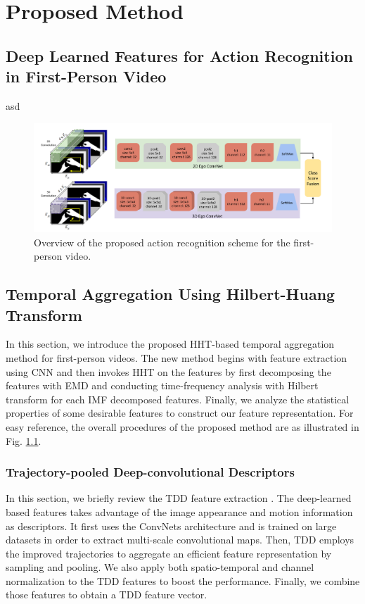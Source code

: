 \newpage
\chapter{Proposed Method}
\section{Deep Learned Features for Action Recognition in First-Person Video}

asd 
\begin{figure}[htttp]
\centering
\includegraphics[width=1\textwidth]{figures/framework2}
\caption{Overview of the proposed action recognition scheme for the first-person video.
} 
\label{fig:framework}
\end{figure}

\section{Temporal Aggregation Using Hilbert-Huang Transform }

In this section, we introduce the proposed  HHT-based temporal
aggregation  method for first-person videos. The new method begins
with feature extraction using CNN \cite{wang2015action} and then
invokes HHT on the features by first decomposing the features with
EMD and conducting time-frequency analysis with Hilbert transform
for each IMF decomposed features. Finally, we analyze the
statistical properties of some desirable features to construct our
feature representation. For easy reference, the overall procedures
of the proposed method are as illustrated in Fig.
\ref{fig:framework}.

\subsection{Trajectory-pooled Deep-convolutional Descriptors}
In this section, we briefly review the TDD feature extraction
\cite{wang2015action}. %
The deep-learned based features takes advantage of the image
appearance and motion information as descriptors.
It first uses the ConvNets architecture and is trained on large
datasets in order to extract multi-scale convolutional maps. Then,
TDD employs the improved trajectories to aggregate an efficient
feature representation by sampling and pooling. We also apply both
spatio-temporal and channel normalization to the TDD features to
boost the performance. Finally, we combine those features to
obtain a TDD feature vector.

